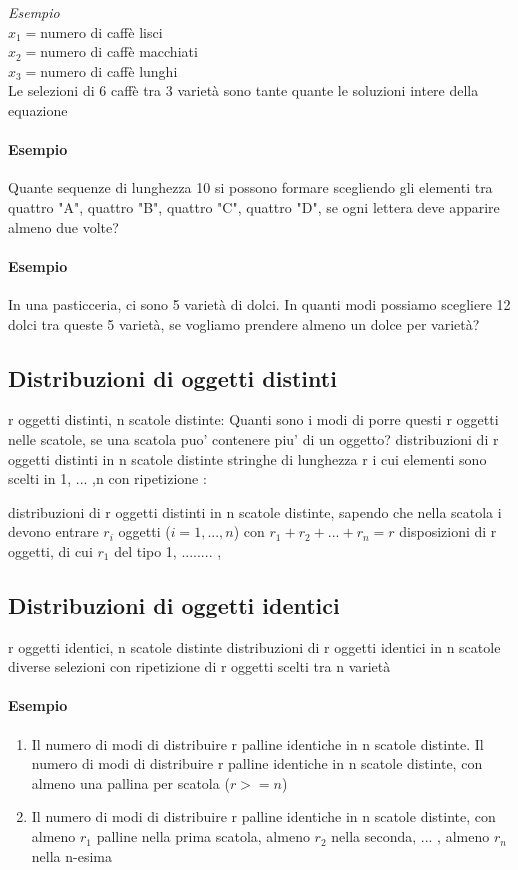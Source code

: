 \textit{Esempio} \\ %
$x_1 = $numero di caffè lisci \\
$x_2 = $numero di caffè macchiati \\
$x_3 = $numero di caffè lunghi \\
Le selezioni di 6 caffè tra 3 varietà sono tante quante le soluzioni intere della equazione

\paragraph{Esempio} %
Quante sequenze di lunghezza 10 si possono formare scegliendo gli elementi tra
quattro "A",
quattro "B",
quattro "C",
quattro "D",
se ogni lettera deve apparire almeno due volte?

\paragraph{Esempio} %
In una pasticceria, ci sono 5 varietà di dolci. In quanti modi possiamo scegliere 12
dolci tra queste 5 varietà, se vogliamo prendere almeno un dolce per varietà?

\subsection{Distribuzioni di oggetti distinti} 
r oggetti distinti, n scatole distinte: Quanti sono i modi di porre questi r oggetti nelle scatole, se
una scatola puo' contenere piu' di un oggetto?
 distribuzioni di r oggetti distinti in n scatole distinte
 stringhe di lunghezza r i cui elementi sono scelti in
{1, ... ,n} con ripetizione :

 distribuzioni di r oggetti distinti in n scatole distinte,
sapendo che nella scatola i devono entrare $r_i$ oggetti
($i=1, ... ,n$) con $r_1 + r_2 + ...+ r_n = r$
 disposizioni di r oggetti, di cui $r_1 $ del tipo 1, ........ ,

\subsection{Distribuzioni di oggetti identici}
r oggetti identici, n scatole distinte
 distribuzioni di r oggetti identici in n scatole diverse
 selezioni con ripetizione di r oggetti scelti tra n varietà

\paragraph{Esempio} %
\begin{enumerate}
    \item Il numero di modi di distribuire r palline identiche in n scatole distinte.
Il numero di modi di distribuire r palline identiche in n scatole distinte,
con almeno una pallina per scatola ($r>=n$)
    \item Il numero di modi di distribuire r palline identiche in n scatole distinte,
con almeno $r_1$ palline nella prima scatola, almeno $r_2$ nella seconda, ... ,
almeno $r_n$ nella n-esima
\end{enumerate}

